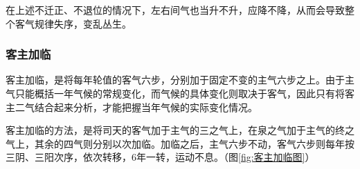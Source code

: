 \documentclass[12pt]{ctexbook}
\begin{document}
在上述不迁正、不退位的情况下，左右间气也当升不升，应降不降，从而会导致整个客气规律失序，变乱丛生。

\subsubsection{客主加临}%

客主加临，是将每年轮值的客气六步，分别加于固定不变的主气六步之上。由于主气只能概括一年气候的常规变化，而气候的具体变化则取决于客气，因此只有将客主二气结合起来分析，才能把握当年气候的实际变化情况。

客主加临的方法，是将司天的客气加于主气的三之气上，在泉之气加于主气的终之气上，其余的四气则分别以次加临。加临之后，主气六步不动，客气六步则每年按三阴、三阳次序，依次转移，6年一转，运动不息。（图\ref{fig:客主加临图}）
\end{document}
